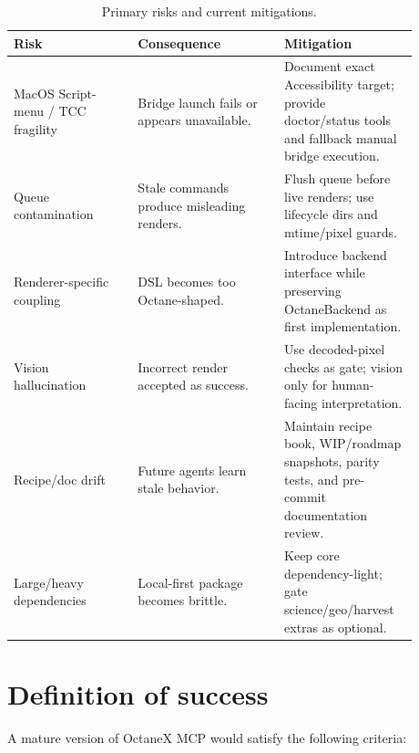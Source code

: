 \documentclass[11pt,a4paper]{article}
\newcommand{\project}{OctaneX MCP}
\begin{document}
\begin{table}[htbp]
\centering
\caption{Primary risks and current mitigations.}
\begin{tabular}{p{0.28\linewidth}p{0.33\linewidth}p{0.27\linewidth}}
\toprule
\textbf{Risk} & \textbf{Consequence} & \textbf{Mitigation} \\
\midrule
MacOS Script-menu / TCC fragility & Bridge launch fails or appears unavailable. & Document exact Accessibility target; provide doctor/status tools and fallback manual bridge execution. \\
Queue contamination & Stale commands produce misleading renders. & Flush queue before live renders; use lifecycle dirs and mtime/pixel guards. \\
Renderer-specific coupling & DSL becomes too Octane-shaped. & Introduce backend interface while preserving OctaneBackend as first implementation. \\
Vision hallucination & Incorrect render accepted as success. & Use decoded-pixel checks as gate; vision only for human-facing interpretation. \\
Recipe/doc drift & Future agents learn stale behavior. & Maintain recipe book, WIP/roadmap snapshots, parity tests, and pre-commit documentation review. \\
Large/heavy dependencies & Local-first package becomes brittle. & Keep core dependency-light; gate science/geo/harvest extras as optional. \\
\bottomrule
\end{tabular}
\end{table}

\section{Definition of success}

A mature version of \project{} would satisfy the following criteria:
\end{document}
